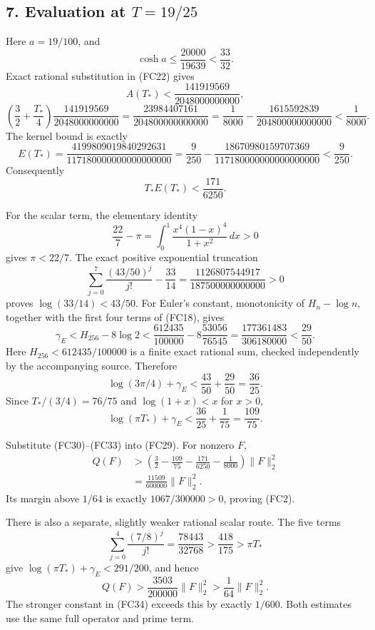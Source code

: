 \documentclass[
  10pt,
  a4paper,
]{article}
\begin{document}
\subsection{\texorpdfstring{7. Evaluation at
\(T=19/25\)}{7. Evaluation at T=19/25}}\label{evaluation-at-t1925}

Here \(a=19/100\), and \[
\cosh a\le\frac{20000}{19639}<\frac{33}{32}.
\] Exact rational substitution in (FC22) gives \[
A(T_*)<
\frac{141919569}{2048000000000},
\] \[
\left(\frac32+\frac{T_*}{4}\right)
\frac{141919569}{2048000000000}
=\frac{23984407161}{204800000000000}
=\frac1{8000}
-\frac{1615592839}{204800000000000}
<\frac1{8000}.
\tag{FC30}
\] The kernel bound is exactly \[
E(T_*)=
\frac{4199809019840292631}{117180000000000000000}
=\frac9{250}-
\frac{18670980159707369}{117180000000000000000}
<\frac9{250}.
\] Consequently \[
T_* E(T_*)<\frac{171}{6250}.
\tag{FC31}
\]

For the scalar term, the elementary identity \[
\frac{22}{7}-\pi=
\int_0^1\frac{x^4(1-x)^4}{1+x^2}\,dx>0
\] gives \(\pi<22/7\). The exact positive exponential truncation \[
\sum_{j=0}^7\frac{(43/50)^j}{j!}
-\frac{33}{14}
=\frac{1126807544917}{187500000000000}>0
\] proves \(\log(33/14)<43/50\). For Euler's constant, monotonicity of
\(H_n-\log n\), together with the first four terms of (FC18), gives \[
\gamma_E<H_{256}-8\log2
<\frac{612435}{100000}-8\frac{53056}{76545}
=\frac{177361483}{306180000}<\frac{29}{50}.
\tag{FC32}
\] Here \(H_{256}<612435/100000\) is a finite exact rational sum,
checked independently by the accompanying source. Therefore \[
\log(3\pi/4)+\gamma_E<\frac{43}{50}+\frac{29}{50}=\frac{36}{25}.
\] Since \(T_*/(3/4)=76/75\) and \(\log(1+x)<x\) for \(x>0\), \[
\boxed{
\log(\pi T_*)+\gamma_E
<\frac{36}{25}+\frac1{75}=\frac{109}{75}.
}
\tag{FC33}
\]

Substitute (FC30)--(FC33) into (FC29). For nonzero \(F\), \[
\begin{aligned}
Q(F)&>
\left(\frac32-\frac{109}{75}-\frac{171}{6250}-\frac1{8000}\right)
\|F\|_2^2\\
&=\frac{11509}{600000}\|F\|_2^2.
\end{aligned}
\tag{FC34}
\] Its margin above \(1/64\) is exactly \(1067/300000>0\), proving
(FC2).

There is also a separate, slightly weaker rational scalar route. The
five terms \[
\sum_{j=0}^4\frac{(7/8)^j}{j!}
=\frac{78443}{32768}
>\frac{418}{175}>\pi T_*
\] give \(\log(\pi T_*)+\gamma_E<291/200\), and hence \[
Q(F)>\frac{3503}{200000}\|F\|_2^2>
\frac1{64}\|F\|_2^2.
\tag{FC35}
\] The stronger constant in (FC34) exceeds this by exactly \(1/600\).
Both estimates use the same full operator and prime term.
\end{document}
